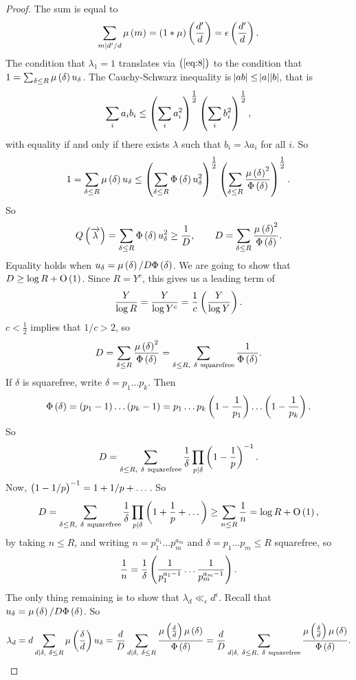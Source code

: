 \begin{proof}
The sum is equal to
$$ \sum_{m \mid d' / d} \mu\br{m} = \br{1 * \mu}\br{\dfrac{d'}{d}} = \epsilon\br{\dfrac{d'}{d}}. $$
The condition that $ \lambda_1 = 1 $ translates via $ \br{\ref{eq:8}} $ to the condition that $ 1 = \sum_{\delta \le R} \mu\br{\delta}u_\delta $. The Cauchy-Schwarz inequality is $ \abs{ab} \le \abs{a}\abs{b} $, that is
$$ \sum_i a_ib_i \le \br{\sum_i a_i^2}^{\tfrac{1}{2}}\br{\sum_i b_i^2}^{\tfrac{1}{2}}, $$
with equality if and only if there exists $ \lambda $ such that $ b_i = \lambda a_i $ for all $ i $. So
$$ 1 = \sum_{\delta \le R} \mu\br{\delta}u_\delta \le \br{\sum_{\delta \le R}\Phi\br{\delta}u_\delta^2}^{\tfrac{1}{2}}\br{\sum_{\delta \le R}\dfrac{\mu\br{\delta}^2}{\Phi\br{\delta}}}^{\tfrac{1}{2}}. $$
So
$$ Q\br{\overrightarrow{\lambda}} = \sum_{\delta \le R} \Phi\br{\delta}u_\delta^2 \ge \dfrac{1}{D}, \qquad D = \sum_{\delta \le R} \dfrac{\mu\br{\delta}^2}{\Phi\br{\delta}}. $$
Equality holds when $ u_\delta = \mu\br{\delta} / D\Phi\br{\delta} $. We are going to show that $ D \ge \log R + \O\br{1} $. Since $ R = Y^c $, this gives us a leading term of
$$ \dfrac{Y}{\log R} = \dfrac{Y}{\log Y^c} = \dfrac{1}{c}\br{\dfrac{Y}{\log Y}}. $$
$ c < \tfrac{1}{2} $ implies that $ 1 / c > 2 $, so
$$ D = \sum_{\delta \le R} \dfrac{\mu\br{\delta}^2}{\Phi\br{\delta}} = \sum_{\delta \le R, \ \delta \ \text{squarefree}} \dfrac{1}{\Phi\br{\delta}}. $$
If $ \delta $ is squarefree, write $ \delta = p_1 \dots p_k $. Then
$$ \Phi\br{\delta} = \br{p_1 - 1} \dots \br{p_k - 1} = p_1 \dots p_k\br{1 - \dfrac{1}{p_1}} \dots \br{1 - \dfrac{1}{p_k}}. $$
So
$$ D = \sum_{\delta \le R, \ \delta \ \text{squarefree}} \dfrac{1}{\delta}\prod_{p \mid \delta} \br{1 - \dfrac{1}{p}}^{-1}. $$
Now, $ \br{1 - 1 / p}^{-1} = 1 + 1 / p + \dots $. So
$$ D = \sum_{\delta \le R, \ \delta \ \text{squarefree}} \dfrac{1}{\delta}\prod_{p \mid \delta} \br{1 + \dfrac{1}{p} + \dots} \ge \sum_{n \le R} \dfrac{1}{n} = \log R + \O\br{1}, $$
by taking $ n \le R $, and writing $ n = p_1^{a_1} \dots p_m^{a_m} $ and $ \delta = p_1 \dots p_m \le R $ squarefree, so
$$ \dfrac{1}{n} = \dfrac{1}{\delta}\br{\dfrac{1}{p_1^{a_1 - 1}} \dots \dfrac{1}{p_m^{a_m - 1}}}. $$
The only thing remaining is to show that $ \lambda_d \ll_\epsilon d^\epsilon $. Recall that $ u_\delta = \mu\br{\delta} / D\Phi\br{\delta} $. So
$$ \lambda_d = d\sum_{d \mid \delta, \ \delta \le R} \mu\br{\dfrac{\delta}{d}}u_\delta = \dfrac{d}{D}\sum_{d \mid \delta, \ \delta \le R} \dfrac{\mu\br{\tfrac{\delta}{d}}\mu\br{\delta}}{\Phi\br{\delta}} = \dfrac{d}{D}\sum_{d \mid \delta, \ \delta \le R, \ \delta \ \text{squarefree}} \dfrac{\mu\br{\tfrac{\delta}{d}}\mu\br{\delta}}{\Phi\br{\delta}}. $$

\end{proof}

